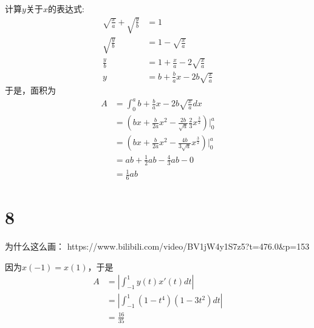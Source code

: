 \documentclass{article}
\begin{document}
计算$y$关于$x$的表达式:
\begin{align*}
  \sqrt{\frac{x}{a}} + \sqrt{\frac{y}{b}} & = 1                                        \\
  \sqrt{\frac{y}{b}}                      & = 1 - \sqrt{\frac{x}{a}}                   \\
  \frac{y}{b}                             & = 1 + \frac{x}{a} - 2\sqrt{\frac{x}{a}}    \\
  y                                       & = b + \frac{b}{a} x - 2b\sqrt{\frac{x}{a}}
\end{align*}
于是，面积为
\begin{align*}
  A & = \int_0^{a} b + \frac{b}{a} x - 2b\sqrt{\frac{x}{a}} dx                              \\
    & = (bx + \frac{b}{2a}x^2 - \frac{2b}{\sqrt{a}} \frac{2}{3}x^{\frac{3}{2}})\bigg|_0^{a} \\
    & = (bx + \frac{b}{2a}x^2 - \frac{4b}{3\sqrt{a}} x^{\frac{3}{2}})\bigg|_0^{a}           \\
    & = ab + \frac{1}{2}ab - \frac{4}{3} ab - 0                                             \\
    & = \frac{1}{6}ab
\end{align*}

\section*{8}


为什么这么画：
https://www.bilibili.com/video/BV1jW4y1S7z5?t=476.0\&p=153

因为$x(-1) = x(1)$，于是
\begin{align*}
  A & = \left| \int_{-1}^{1} y(t) x'(t)  dt\right|        \\
    & = \left| \int_{-1}^{1} (1- t^4)(1 - 3t^2) dt\right| \\
    & = \frac{16}{35}
\end{align*}
\end{document}
